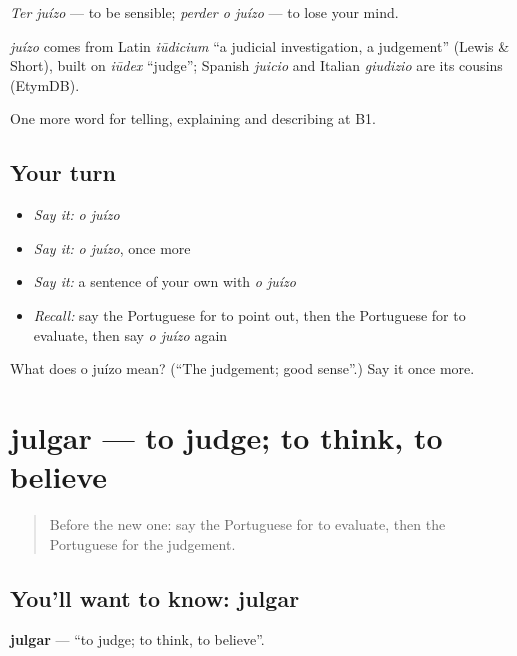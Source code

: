 \emph{Ter juízo} — to be sensible; \emph{perder o juízo} — to lose your mind.

\begin{cousinweb}
\emph{juízo} comes from Latin \emph{iūdicium} \textquotedblleft{}a judicial investigation, a judgement\textquotedblright{} (Lewis \& Short), built on \emph{iūdex} \textquotedblleft{}judge\textquotedblright{}; Spanish \emph{juicio} and Italian \emph{giudizio} are its cousins (EtymDB).
\end{cousinweb}

\begin{grammarlens}[title={What you've built}]
One more word for telling, explaining and describing at B1.
\end{grammarlens}

\subsection*{Your turn}
\begin{itemize}
\raggedright
  \item \emph{Say it:} \emph{o juízo}
  \item \emph{Say it:} \emph{o juízo}, once more
  \item \emph{Say it:} a sentence of your own with \emph{o juízo}
  \item \emph{Recall:} say the Portuguese for to point out, then the Portuguese for to evaluate, then say \emph{o juízo} again
\end{itemize}

\begin{tcolorbox}[breakable,colback=teal!4,colframe=teal!35!black,title={Before you move on}]
What does o juízo mean? (\textquotedblleft{}The judgement; good sense\textquotedblright{}.) Say it once more.
\end{tcolorbox}
\section[julgar]{julgar — to judge; to think, to believe}

\label{lesson:PT-C344-julgar}



\begin{quote}
Before the new one: say the Portuguese for to evaluate, then the Portuguese for the judgement.
\end{quote}

\subsection*{You'll want to know: julgar}
\textbf{julgar} — \textquotedblleft{}to judge; to think, to believe\textquotedblright{}.

